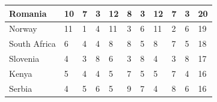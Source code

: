 \documentclass[12pt]{article}  %
\begin{document}
\begin{subappendices}
\begin{longtable}{|l|l|l|l|l|l|l|l|l|l|l|}
	\hline
	Romania                                                        & 10                                                & 7                                                 & 3                                                 & 12                                                & 8                                                 & 3                                                 & 12   & 7      & 3      & 20     \\ 
	\hline
	Norway                                                         & 11                                                & 1                                                 & 4                                                 & 11                                                & 3                                                 & 6                                                 & 11   & 2      & 6      & 19     \\ 
	\hline
	South Africa                                                   & 6                                                 & 4                                                 & 4                                                 & 8                                                 & 8                                                 & 5                                                 & 8    & 7      & 5      & 18     \\ 
	\hline
	Slovenia                                                       & 4                                                 & 3                                                 & 8                                                 & 6                                                 & 3                                                 & 8                                                 & 4    & 3      & 8      & 17     \\ 
	\hline
	Kenya                                                          & 5                                                 & 4                                                 & 4                                                 & 5                                                 & 7                                                 & 5                                                 & 5    & 7      & 4      & 16     \\ 
	\hline
	Serbia                                                         & 4                                                 & 5                                                 & 6                                                 & 5                                                 & 9                                                 & 7                                                 & 4    & 8      & 6      & 16     \\ 

\end{longtable}
\end{subappendices}
\end{document}
